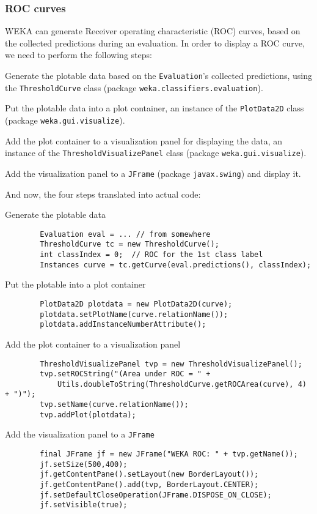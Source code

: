 \newpage

\subsubsection*{ROC curves}
WEKA can generate Receiver operating characteristic (ROC) curves, based on the
collected predictions during an evaluation. In order to display a ROC curve, we
need to perform the following steps:
\begin{tight_enumerate}
	\item Generate the plotable data based on the \texttt{Evaluation}'s
collected predictions, using the \texttt{ThresholdCurve} class (package
\texttt{weka.classifiers.evaluation}).
	\item Put the plotable data into a plot container, an instance of the
\texttt{PlotData2D} class (package \texttt{weka.gui.visualize}).
	\item Add the plot container to a visualization panel for displaying the
data, an instance of the \texttt{ThresholdVisualizePanel} class (package
\texttt{weka.gui.visualize}).
	\item Add the visualization panel to a \texttt{JFrame} (package
\texttt{javax.swing}) and display it.
\end{tight_enumerate}
And now, the four steps translated into actual code:
\begin{tight_enumerate}
	\item Generate the plotable data
	\begin{verbatim}
		Evaluation eval = ... // from somewhere
		ThresholdCurve tc = new ThresholdCurve();
		int classIndex = 0;  // ROC for the 1st class label
		Instances curve = tc.getCurve(eval.predictions(), classIndex);
	\end{verbatim}

	\item Put the plotable into a plot container
	\begin{verbatim}
		PlotData2D plotdata = new PlotData2D(curve);
		plotdata.setPlotName(curve.relationName());
		plotdata.addInstanceNumberAttribute();
	\end{verbatim}

	\item Add the plot container to a visualization panel
	\begin{verbatim}
		ThresholdVisualizePanel tvp = new ThresholdVisualizePanel();
		tvp.setROCString("(Area under ROC = " +
			Utils.doubleToString(ThresholdCurve.getROCArea(curve), 4) + ")");
		tvp.setName(curve.relationName());
		tvp.addPlot(plotdata);
	\end{verbatim}

	\item Add the visualization panel to a \texttt{JFrame}
	\begin{verbatim}
		final JFrame jf = new JFrame("WEKA ROC: " + tvp.getName());
		jf.setSize(500,400);
		jf.getContentPane().setLayout(new BorderLayout());
		jf.getContentPane().add(tvp, BorderLayout.CENTER);
		jf.setDefaultCloseOperation(JFrame.DISPOSE_ON_CLOSE);
		jf.setVisible(true);
	\end{verbatim}
\end{tight_enumerate}

